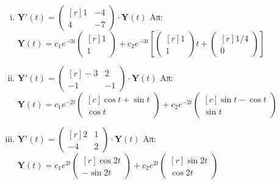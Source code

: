 \begin{enumerate}
\begin{enumerate}[i)]
      \item $ \mathbf{Y}'(t) = 
        \begin{pmatrix*}[r]
          1 & -4 \\
          4 & -7
        \end{pmatrix*} \cdot
        \mathbf{Y}(t) $ 
        \hfill Απ: {\scriptsize $ \mathbf{Y}(t) = c_{1}e^{-3t} 
          \begin{pmatrix*}[r] 1 \\ 1 \end{pmatrix*} + c_{2}e^{-3t} \left[
            \begin{pmatrix*}[r] 1 \\ 1 \end{pmatrix*} t + 
        \begin{pmatrix*}[r] 1/4 \\ 0 \end{pmatrix*}  \right] $}

      \item $ \mathbf{Y}'(t) = 
        \begin{pmatrix*}[r]
          -3 & 2 \\
          -1 & -1
        \end{pmatrix*} \cdot 
        \mathbf{Y}(t) $
        \hfill Απ: {\scriptsize $ \mathbf{Y}(t) = c_{1}e^{-2t} 
          \begin{pmatrix*}[c] \cos{t} + \sin{t} \\ \cos{t} \end{pmatrix*} + c_{2}e^{-2t} 
        \begin{pmatrix*}[c] \sin{t} - \cos{t} \\ \sin{t} \end{pmatrix*} $}

      \item $ \mathbf{Y}'(t) = 
        \begin{pmatrix*}[r]
          2 & 1 \\
          -4 & 2
        \end{pmatrix*} \cdot 
        \mathbf{Y}(t) $
        \hfill Απ: {\scriptsize $ \mathbf{Y}(t) = c_{1}e^{2t} 
          \begin{pmatrix*}[r] \cos{2t} \\ -\sin{2t} \end{pmatrix*} + c_{2}e^{2t} 
        \begin{pmatrix*}[r] \sin{2t} \\ \cos{2t}  \end{pmatrix*} $}
    \end{enumerate}


\end{enumerate}
